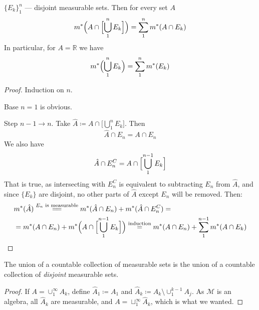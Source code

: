 \begin{proposition}
    \label{prop:disjointIntersectionSum}
    $\{E_k\}_1^n$ --- disjoint measurable sets. Then for every set $A$
    \[
        m^*\Bigl(A \cap \Bigl[\bigcup_1^n E_k\Bigr]\Bigr) = \sum_1^n m^*(A \cap E_k)
    \]
    In particular, for $A = \mathbb{R}$ we have
    \[
        m^*\Bigl(\bigcup_1^n E_k\Bigr) = \sum_1^n m^*(E_k)
    \]
\end{proposition}
\begin{proof}
    Induction on $n$.

    Base $n=1$ is obvious.

    Step $n - 1 \to n$. Take $\hat{A} \coloneqq A \cap \bigl[ \bigcup_1^n E_k \bigr]$.
    Then \[\hat{A} \cap E_n = A \cap E_n \]
    We also have \[\hat{A} \cap E_n^C = A \cap \Bigl[ \bigcup_1^{n - 1} E_k \Bigr]\]
    That is true, as intersecting 
    with $E_n^C$ is equivalent to subtracting $E_n$ from $\hat{A}$, and since
    $\{E_k\}$ are disjoint, no other parts of $\hat{A}$ except $E_n$ will be removed. Then:
    \begin{align*}
        &m^*(\hat{A}) \overset{E_n \text{ is measurable}}{=\joinrel=} m^*(\hat{A} \cap E_n) + m^*(\hat{A} \cap E_n^C)
        =
        \\&
        = m^*(A \cap E_n) + m^*\Bigl(A \cap \Bigl[\bigcup_{1}^{n-1} E_k\Bigr]\Bigr)
        \overset{\text{induction}}{=} m^*(A \cap E_n) + \sum_{1}^{n-1} m^*(A \cap E_k)
    \end{align*}
\end{proof}

\begin{proposition}
    \label{prop:unionOfCountable}
    The union of a countable collection of measurable sets is the union
    of a countable collection of \textit{disjoint} measurable sets.
\end{proposition}
\begin{proof}
    If $A = \cup_1^\infty A_k$, define $\hat{A}_1 \coloneqq A_1$ and
    $\hat{A}_k \coloneqq A_k \setminus \cup_1^{k-1} A_j$.
    As $\mathcal{M}$ is an algebra, all $\hat{A}_k$ are measurable, and
    $A = \sqcup_1^\infty \hat{A}_k$, which is what we wanted.
\end{proof}

